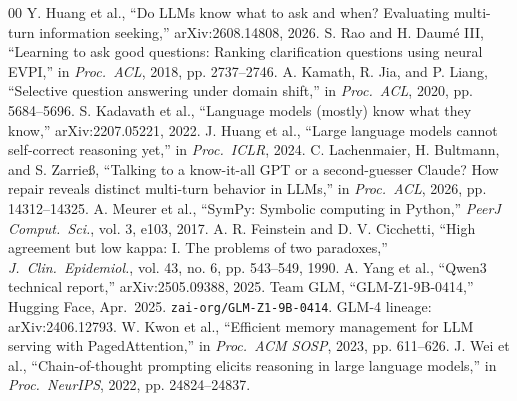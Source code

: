\documentclass[conference,letterpaper,10pt]{IEEEtran}
\begin{document}
{\begin{thebibliography}{00}
 Y. Huang et al., ``Do LLMs know what to ask and when? Evaluating multi-turn information seeking,'' arXiv:2608.14808, 2026.
 S. Rao and H. Daum\'{e} III, ``Learning to ask good questions: Ranking clarification questions using neural EVPI,'' in \textit{Proc.\ ACL}, 2018, pp. 2737--2746.
 A. Kamath, R. Jia, and P. Liang, ``Selective question answering under domain shift,'' in \textit{Proc.\ ACL}, 2020, pp. 5684--5696.
 S. Kadavath et al., ``Language models (mostly) know what they know,'' arXiv:2207.05221, 2022.
 J. Huang et al., ``Large language models cannot self-correct reasoning yet,'' in \textit{Proc.\ ICLR}, 2024.
 C. Lachenmaier, H. Bultmann, and S. Zarrie{\ss}, ``Talking to a know-it-all GPT or a second-guesser Claude? How repair reveals distinct multi-turn behavior in LLMs,'' in \textit{Proc.\ ACL}, 2026, pp. 14312--14325.
 A. Meurer et al., ``SymPy: Symbolic computing in Python,'' \textit{PeerJ Comput.\ Sci.}, vol. 3, e103, 2017.
 A. R. Feinstein and D. V. Cicchetti, ``High agreement but low kappa: I. The problems of two paradoxes,'' \textit{J.\ Clin.\ Epidemiol.}, vol. 43, no. 6, pp. 543--549, 1990.
 A. Yang et al., ``Qwen3 technical report,'' arXiv:2505.09388, 2025.
 Team GLM, ``GLM-Z1-9B-0414,'' Hugging Face, Apr.\ 2025. \texttt{zai-org/\allowbreak GLM-Z1-9B-0414}. GLM-4 lineage: arXiv:2406.12793.
 W. Kwon et al., ``Efficient memory management for LLM serving with PagedAttention,'' in \textit{Proc.\ ACM SOSP}, 2023, pp. 611--626.
 J. Wei et al., ``Chain-of-thought prompting elicits reasoning in large language models,'' in \textit{Proc.\ NeurIPS}, 2022, pp. 24824--24837.

\end{thebibliography}}
\end{document}
